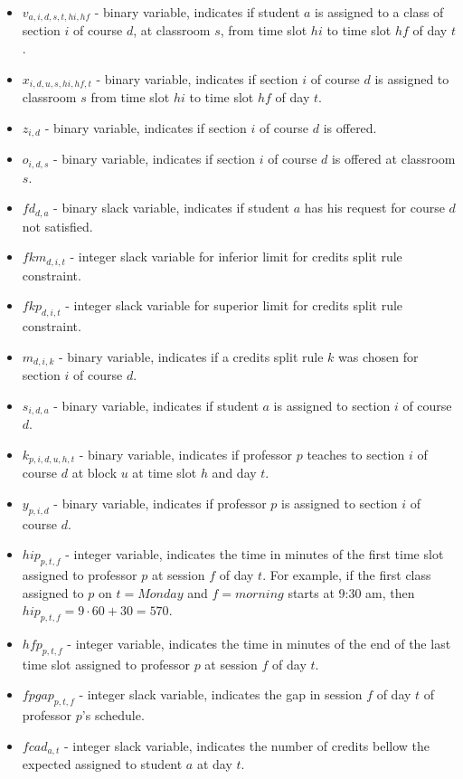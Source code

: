 \begin{itemize}
\item $v_{a,i,d,s,t,hi,hf}$ - binary variable, indicates if student $a$ is assigned to a class of section $i$ of course $d$, at classroom $s$, from time slot $hi$ to time slot $hf$ of day $t$. 
\item $x_{i,d,u,s,hi,hf,t}$ - binary variable, indicates if section $i$ of course $d$ is assigned to classroom $s$ from time slot $hi$ to time slot $hf$ of day $t$. 
\item $z_{i,d}$ - binary variable, indicates if section $i$ of course $d$ is offered. 
\item $o_{i,d,s}$ - binary variable, indicates if section $i$ of course $d$ is offered at classroom $s$. 
\item $fd_{d,a}$ - binary slack variable, indicates if student $a$ has his request for course $d$ not satisfied.
\item $fkm_{d,i,t}$ - integer slack variable for inferior limit for credits split rule constraint. 
\item $fkp_{d,i,t}$ - integer slack variable for superior limit for credits split rule constraint.
\item $m_{d,i,k}$ - binary variable, indicates if a credits split rule $k$ was chosen for section $i$ of course $d$.
\item $s_{i,d,a}$ - binary variable, indicates if student $a$ is assigned to section $i$ of course $d$.
\item $k_{p,i,d,u,h,t}$ - binary variable, indicates if professor $p$ teaches to section $i$ of course $d$ at block $u$ at time slot $h$ and day $t$.
\item $y_{p,i,d}$ - binary variable, indicates if professor $p$ is assigned to section $i$ of course $d$.
\item $hip_{p,t,f}$ - integer variable, indicates the time in minutes of the first time slot assigned to professor $p$ at session $f$ of day $t$. For example, if the first class assigned to $p$ on $t=Monday$ and $f=morning$ starts at 9:30 am, then $hip_{p,t,f}=9\cdot 60 + 30 = 570$.
\item $hfp_{p,t,f}$ - integer variable, indicates the time in minutes of the end of the last time slot assigned to professor $p$ at session $f$ of day $t$.
\item $fpgap_{p,t,f}$ - integer slack variable, indicates the gap in session $f$ of day $t$ of professor $p$'s schedule.
\item $fcad_{a,t}$ - integer slack variable, indicates the number of credits bellow the expected assigned to student $a$ at day $t$.

\end{itemize}
